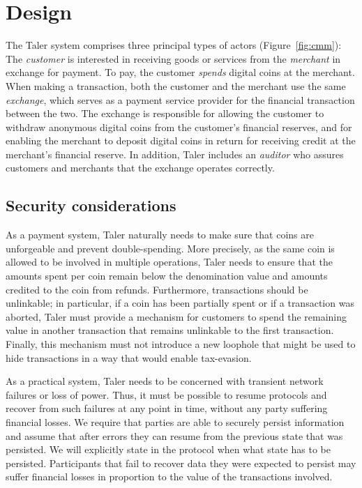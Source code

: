 \documentclass[sigconf, authordraft]{acmart}
\begin{document}
\section{Design}

The Taler system comprises three principal types of actors
(Figure~\ref{fig:cmm}): The \emph{customer} is interested in receiving
goods or services from the \emph{merchant} in exchange for payment.
To pay, the customer {\em spends} digital coins at the merchant.  When
making a transaction, both the customer and the merchant use the same
\emph{exchange}, which serves as a payment service provider for the
financial transaction between the two.  The exchange is responsible
for allowing the customer to withdraw anonymous digital coins from the
customer's financial reserves, and for enabling the merchant to
deposit digital coins in return for receiving credit at the merchant's
financial reserve.  In addition, Taler includes an \emph{auditor} who
assures customers and merchants that the exchange operates correctly.

\subsection{Security considerations}

As a payment system, Taler naturally needs to make sure that coins are
unforgeable and prevent double-spending.  More precisely, as the same
coin is allowed to be involved in multiple operations, Taler needs to
ensure that the amounts spent per coin remain below the denomination
value and amounts credited to the coin from refunds.  Furthermore,
transactions should be unlinkable; in particular, if a coin has been
partially spent or if a transaction was aborted, Taler must provide a
mechanism for customers to spend the remaining value in another
transaction that remains unlinkable to the first transaction.  Finally,
this mechanism must not introduce a new loophole that might be used to
hide transactions in a way that would enable tax-evasion.

As a practical system, Taler needs to be concerned with transient
network failures or loss of power.  Thus, it must be possible to
resume protocols and recover from such failures at any point in time,
without any party suffering financial losses.  We require that parties
are able to securely persist information and assume that after
errors they can resume from the previous state that was persisted.
We will explicitly state in the protocol when what state has
to be persisted.  Participants that fail to recover data they were
expected to persist may suffer financial losses in proportion to the
value of the transactions involved.
\end{document}
